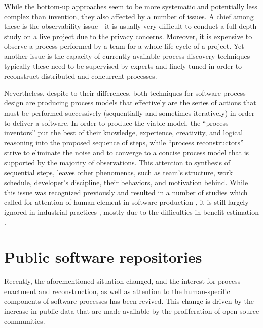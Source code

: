 While the bottom-up approaches seem to be more systematic and potentially less complex than invention, 
they also affected by a number of issues. A chief among these is the observability issue - 
it is usually very difficult to conduct a full depth study on a live project due to the privacy concerns. 
Moreover, it is expensive to observe a process performed by a team for a whole life-cycle of a project. 
Yet another issue is the capacity of currently available process discovery techniques - 
typically these need to be supervised by experts and finely tuned in order to reconstruct 
distributed and concurrent processes. 

Nevertheless, despite to their differences, both techniques for software process design are 
producing process models that effectively are the series of actions that must be performed successively 
(sequentially and sometimes iteratively) in order to deliver a software. 
In order to produce the viable model, the ``process inventors'' put the best of their knowledge, experience,
creativity, and logical reasoning into the proposed sequence of steps, while ``process reconstructors'' 
strive to eliminate the noise and to converge to a concise process model that is supported by the 
majority of observations. 
This attention to synthesis of sequential steps, leaves other phenomenas, such as team's structure, work schedule, 
developer's discipline, their behaviors, and motivation behind. While this issue was recognized previously
and resulted in a number of studies which called for attention of human element in software production 
\cite{citeulike:149387} \cite{citeulike:113403} \cite{citeulike:205322} \cite{citeulike:12798652}, 
it is still largely ignored in industrial practices \cite{citeulike:12798659}, mostly due to the 
difficulties in benefit estimation \cite{citeulike:12798662} \cite{csdl2-12-11}.

%
%
\section{Public software repositories}\label{section_public_repositories}
Recently, the aforementioned situation changed, and the interest for process enactment and reconstruction, 
as well as attention to the human-specific components of software processes has been revived. 
This change is driven by the increase in public data that are made available by the proliferation of open 
source communities.

